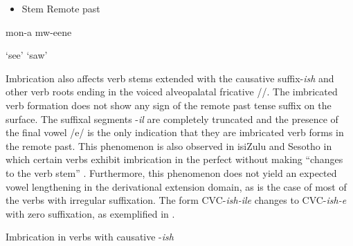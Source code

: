 \documentclass[output=paper]{langsci/langscibook}
\begin{document}
\begin{itemize}
\item \begin{stylelsLanginfo}
   Stem          Remote past
\end{stylelsLanginfo}\end{itemize}
\begin{stylelsSourceline}
    mon-a          mw-eene  
\end{stylelsSourceline}

\begin{stylelsTranslation}
‘see’          ‘saw’
\end{stylelsTranslation}

Imbrication also affects verb stems extended with the causative suffix-\emph{ish} and other verb roots ending in the voiced alveopalatal fricative //. The imbricated verb formation does not show any sign of the remote past tense suffix on the surface. The suffixal segments -\emph{il} are completely truncated and the presence of the final vowel /e/ is the only indication that they are imbricated verb forms in the remote past. This phenomenon is also observed in isiZulu and Sesotho in which certain verbs exhibit imbrication in the perfect without making “changes to the verb stem” \citep{Monich2015}. Furthermore, this phenomenon does not yield an expected vowel lengthening in the derivational extension domain, as is the case of most of the verbs with irregular suffixation. The form CVC-\emph{ish-ile} changes to CVC-\emph{ish-e} with zero suffixation, as exemplified in .

\begin{table}
\caption{Imbrication in verbs with causative -\emph{ish}}
\label{tab:24}
\end{table}
\end{document}
